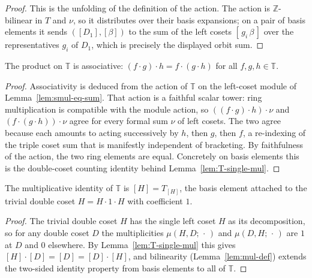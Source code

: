 \begin{proof}
\leanok
This is the unfolding of the definition of the action. The action is $\mathbb{Z}$-bilinear
in $T$ and $\nu$, so it distributes over their basis expansions; on a pair of basis
elements it sends $([D_1],[\beta])$ to the sum of the left cosets $[\,g_i\,\beta\,]$ over
the representatives $g_i$ of $D_1$, which is precisely the displayed orbit sum.
\end{proof}

\begin{lemma}[Associativity]\label{lem:mul-assoc}
\leanok
The product on $\mathbb{T}$ is associative: $(f\cdot g)\cdot h=f\cdot(g\cdot h)$ for all
$f,g,h\in\mathbb{T}$.
\end{lemma}

\begin{proof}
\leanok
Associativity is deduced from the action of $\mathbb{T}$ on the left-coset module of
Lemma~\ref{lem:smul-eq-sum}. That action is a faithful scalar tower: ring multiplication
is compatible with the module action, so $((f\cdot g)\cdot h)\cdot\nu$ and
$(f\cdot(g\cdot h))\cdot\nu$ agree for every formal sum $\nu$ of left cosets. The two
agree because each amounts to acting successively by $h$, then $g$, then $f$, a
re-indexing of the triple coset sum that is manifestly independent of bracketing. By
faithfulness of the action, the two ring elements are equal. Concretely on basis elements
this is the double-coset counting identity behind Lemma~\ref{lem:T-single-mul}.
\end{proof}

\begin{lemma}\label{lem:one-def}
\leanok
The multiplicative identity of $\mathbb{T}$ is $[H]=T_{[H]}$, the basis element attached
to the trivial double coset $H=H\cdot 1\cdot H$ with coefficient $1$.
\end{lemma}

\begin{proof}
\leanok
The trivial double coset $H$ has the single left coset $H$ as its decomposition, so for
any double coset $D$ the multiplicities $\mu(H,D;\,\cdot\,)$ and $\mu(D,H;\,\cdot\,)$ are
$1$ at $D$ and $0$ elsewhere. By Lemma~\ref{lem:T-single-mul} this gives
$[H]\cdot[D]=[D]=[D]\cdot[H]$, and bilinearity (Lemma~\ref{lem:mul-def}) extends the
two-sided identity property from basis elements to all of $\mathbb{T}$.
\end{proof}

